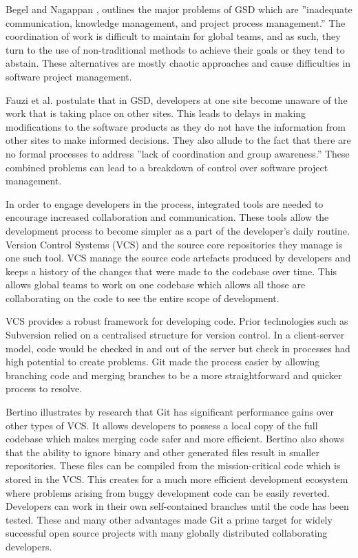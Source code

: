 \documentclass{mproj}
\begin{document}
Begel and Nagappan \cite{Begel:2008}, outlines the major problems of GSD which are ”inadequate communication, knowledge management, and project process management.” The coordination of work is difficult to maintain for global teams, and as such, they turn to the use of non-traditional methods to achieve their goals or they tend to abstain. These alternatives are mostly chaotic approaches and cause difficulties in software project management.

Fauzi et al. \cite{Fauzi:2010} postulate that in GSD, developers at one site become unaware of the work that is taking place on other sites. This leads to delays in making modifications to the software products as they do not have the information from other sites to make informed decisions. They also allude to the fact that there are no formal processes to address ”lack of coordination and group awareness.” These combined problems can lead to a breakdown of control over software project management.

In order to engage developers in the process, integrated tools are needed to encourage increased collaboration and communication. These tools allow the development process to become simpler as a part of the developer's daily routine. Version Control Systems (VCS) and the source core repositories they manage is one such tool. VCS manage the source code artefacts produced by developers and keeps a history of the changes that were made to the codebase over time. This allows global teams to work on one codebase which allows all those are collaborating on the code to see the entire scope of development.

VCS provides a robust framework for developing code. Prior technologies such as Subversion relied on a centralised structure for version control. In a client-server model, code would be checked in and out of the server but check in processes had high potential to create problems. Git made the process easier by allowing branching code and merging branches to be a more straightforward and quicker process to resolve.

Bertino \cite{Bertino:2012} illustrates by research that Git has significant performance gains over other types of VCS. It allows developers to possess a local copy of the full codebase which makes merging code safer and more efficient. Bertino also shows that the ability to ignore binary and other generated files result in smaller repositories. These files can be compiled from the mission-critical code which is stored in the VCS. This creates for a much more efficient development ecosystem where problems arising from buggy development code can be easily reverted. Developers can work in their own self-contained branches until the code has been tested. These and many other advantages made Git a prime target for widely successful open source projects with many globally distributed collaborating developers.
\end{document}
